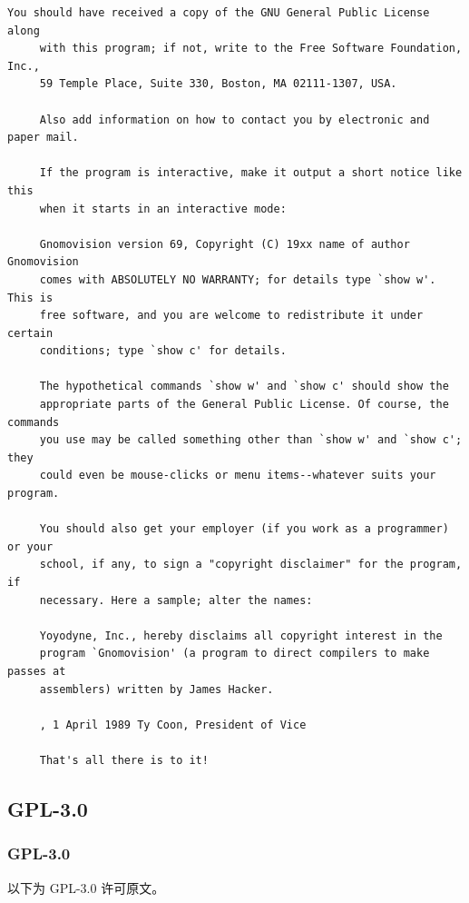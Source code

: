 \begin{lstlisting}[basicstyle=\ttfamily\footnotesize,breaklines=true]
     You should have received a copy of the GNU General Public License along
     with this program; if not, write to the Free Software Foundation, Inc.,
     59 Temple Place, Suite 330, Boston, MA 02111-1307, USA.

     Also add information on how to contact you by electronic and paper mail.

     If the program is interactive, make it output a short notice like this
     when it starts in an interactive mode:

     Gnomovision version 69, Copyright (C) 19xx name of author Gnomovision
     comes with ABSOLUTELY NO WARRANTY; for details type `show w'. This is
     free software, and you are welcome to redistribute it under certain
     conditions; type `show c' for details.

     The hypothetical commands `show w' and `show c' should show the
     appropriate parts of the General Public License. Of course, the commands
     you use may be called something other than `show w' and `show c'; they
     could even be mouse-clicks or menu items--whatever suits your program.

     You should also get your employer (if you work as a programmer) or your
     school, if any, to sign a "copyright disclaimer" for the program, if
     necessary. Here a sample; alter the names:

     Yoyodyne, Inc., hereby disclaims all copyright interest in the
     program `Gnomovision' (a program to direct compilers to make passes at
     assemblers) written by James Hacker.

     , 1 April 1989 Ty Coon, President of Vice

     That's all there is to it!
\end{lstlisting}

\subsection{GPL-3.0}
\subsubsection*{GPL-3.0}

以下为 GPL-3.0 许可原文。


